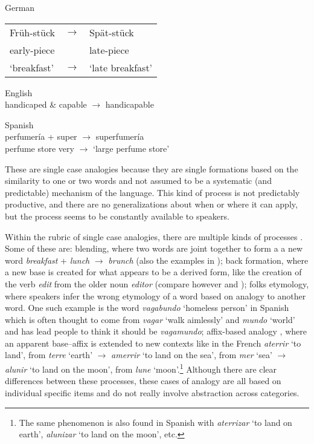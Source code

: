 \begin{exe}
    \ex \label{exe-germ-en1} German\\
    \begin{tabular}[t]{@{}lcl}
      Früh-stück & $\rightarrow$& Spät-stück\\
      early-piece &&late-piece\\
      `breakfast' &$\rightarrow$& `late breakfast'\\
    \end{tabular}
    \ex English\\
    handicaped \& capable  $\rightarrow$ handicapable

    \ex \label{blends-spanish} Spanish\\
    \gll perfumería  + super $\rightarrow$ superfumería \\
    {perfume store} {} very $\rightarrow$ {`large perfume store'}\\

\end{exe}


These are single case analogies because they are single formations based on the similarity to one or two words and not assumed to be a systematic (and predictable) mechanism of the language. This kind of process is not predictably productive, and there are no generalizations about when or where it can apply, but the process seems to be constantly available to speakers. 

Within the rubric of single case analogies, there are multiple kinds of processes \autocite[278]{Anderson.2015}. Some of these are: blending, where two words are joint together to form a a new word \textit{breakfast} + \textit{lunch} $\rightarrow$ \textit{brunch} (also the examples in ); back formation, where a new base is created for what appears to be a derived form, like the creation of the verb \textit{edit} from the older noun \textit{editor} (compare however \citealt{vanMarle.1985} and \citealt{Becker.1993}); folks etymology, where speakers infer the wrong etymology of a word based on analogy to another word. One such example is the word \textit{vaga\emph{bundo}} `homeless person' in Spanish which is often thought to come from \textit{vagar} `walk aimlessly' and \textit{mundo} `world' and has lead people to think it should be \textit{vaga\emph{m}undo}; affix-based analogy \autocite{Kilani-Schoch.2005}, where an apparent base--affix is extended to new contexts like in the French \textit{aterrir} `to land', from \textit{terre} `earth' $\rightarrow$ \textit{amerrir} `to land on the sea', from \textit{mer} `sea' $\rightarrow$ \textit{alunir} `to land on the moon', from \textit{lune} `moon'.\footnote{The same phenomenon is also found in Spanish with \textit{aterrizar} `to land on earth', \textit{alunizar} `to land on the moon', etc.} Although there are clear differences between these processes, these cases of analogy are all based on individual specific items and do not really involve abstraction across categories.

